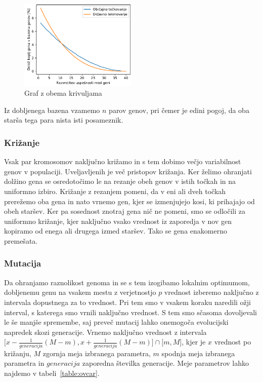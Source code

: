 \begin{figure}[ht]  %
	\centering
	\includegraphics[width=0.5\textwidth]{../poglavja/images/parjenje.pdf}
	\caption[Verjetnost parjenja]{Graf z obema krivuljama} %
	\label{fig:verjetnost-parjenja}
\end{figure}

Iz dobljenega bazena vzamemo $n$ parov genov, pri čemer je edini pogoj, da oba starša tega para nista isti posameznik.

\subsubsection{Križanje}

Vsak par kromosomov naključno križamo in s tem dobimo večjo variabilnost genov v populaciji. Uveljavljenih je več pristopov križanja. Ker želimo ohranjati dolžino gena se osredotočimo le na rezanje obeh genov v istih točkah in na uniformno izbiro. Križanje z rezanjem pomeni, da v eni ali dveh točkah prerežemo oba gena in nato vrnemo gen, kjer se izmenjujejo kosi, ki prihajajo od obeh staršev. Ker pa sosednost znotraj gena nič ne pomeni, smo se odločili za uniformno križanje, kjer naključno vsako vrednost iz zaporedja v nov gen kopiramo od enega ali drugega izmed staršev. Tako se gena enakomerno premešata.

\subsubsection{Mutacija}

Da ohranjamo raznolikost genoma in se s tem izogibamo lokalnim optimumom, dobljenemu genu na vsakem mestu z verjetnostjo $p$ vrednost izberemo naključno z intervala dopustnega za to vrednost. Pri tem smo v vsakem koraku naredili ožji interval, s katerega smo vrnili naključno vrednost. S tem smo sčasoma dovoljevali le še manjše spremembe, saj preveč mutacij lahko onemogoča evolucijski napredek skozi generacije. Vrnemo naključno vrednost z intervala $\lbrack x - \frac{1}{generacija} (M - m), x + \frac{1}{generacija} (M - m)\rbrack \cap \lbrack m, M \rbrack$, kjer je $x$ vrednost po križanju, $M$ zgornja meja izbranega parametra, $m$ spodnja meja izbranega parametra in $generacija$ zaporedna številka generacije. Meje parametrov lahko najdemo v tabeli~\ref{table:ovcar}.

